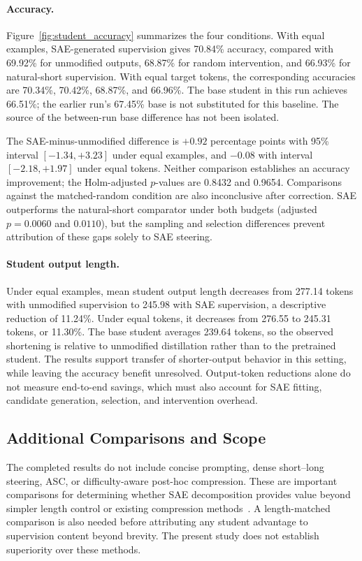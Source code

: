 \paragraph{Accuracy.}
Figure~\ref{fig:student_accuracy} summarizes the four conditions.
With equal examples, SAE-generated supervision gives 70.84\% accuracy, compared with 69.92\% for unmodified outputs, 68.87\% for random intervention, and 66.93\% for natural-short supervision.
With equal target tokens, the corresponding accuracies are 70.34\%, 70.42\%, 68.87\%, and 66.96\%.
The base student in this run achieves 66.51\%; the earlier run's 67.45\% base is not substituted for this baseline.
The source of the between-run base difference has not been isolated.

The SAE-minus-unmodified difference is $+0.92$ percentage points with 95\% interval $[-1.34,+3.23]$ under equal examples, and $-0.08$ with interval $[-2.18,+1.97]$ under equal tokens.
Neither comparison establishes an accuracy improvement; the Holm-adjusted $p$-values are 0.8432 and 0.9654.
Comparisons against the matched-random condition are also inconclusive after correction.
SAE outperforms the natural-short comparator under both budgets (adjusted $p=0.0060$ and $0.0110$), but the sampling and selection differences prevent attribution of these gaps solely to SAE steering.

\paragraph{Student output length.}
Under equal examples, mean student output length decreases from 277.14 tokens with unmodified supervision to 245.98 with SAE supervision, a descriptive reduction of 11.24\%.
Under equal tokens, it decreases from 276.55 to 245.31 tokens, or 11.30\%.
The base student averages 239.64 tokens, so the observed shortening is relative to unmodified distillation rather than to the pretrained student.
The results support transfer of shorter-output behavior in this setting, while leaving the accuracy benefit unresolved.
Output-token reductions alone do not measure end-to-end savings, which must also account for SAE fitting, candidate generation, selection, and intervention overhead.

\subsection{Additional Comparisons and Scope}
\label{sec:experiment_scope}

The completed results do not include concise prompting, dense short--long steering, ASC, or difficulty-aware post-hoc compression.
These are important comparisons for determining whether SAE decomposition provides value beyond simpler length control or existing compression methods~\citep{azizi2026activation,wu2025concise}.
A length-matched comparison is also needed before attributing any student advantage to supervision content beyond brevity.
The present study does not establish superiority over these methods.

